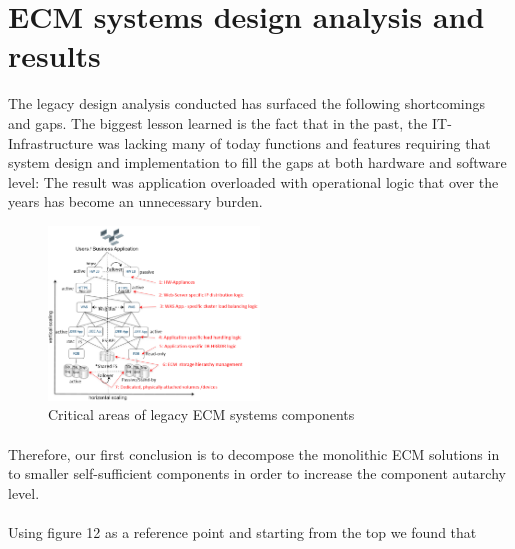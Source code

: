 \documentclass[EPiC]{easychair} %
\begin{document}
\section{ECM systems design analysis and results}
\label{analysis_and_results}
 
The legacy design analysis conducted has surfaced the following shortcomings and gaps.  The biggest lesson learned is the fact that in the past, the IT-Infrastructure was lacking many of today functions and features requiring that system design and implementation to fill the gaps at both hardware and software level: The result was application overloaded with operational logic that over the years has become an unnecessary burden.

\begin{figure}[hbt!]
	\begin{centering}
	\includegraphics[width=0.5\textwidth]{pics/ECMpic18}
	\caption{ Critical areas of legacy ECM systems components}
	\label{fig:ecm-critical-areas}
	\end{centering}
\end{figure}

    \paragraph{} Therefore, our first conclusion is to decompose the monolithic ECM solutions in to smaller self-sufficient components in order to increase the component autarchy level.

    \paragraph{} Using figure 12 as a reference point and starting from the top we found that 
\end{document}
